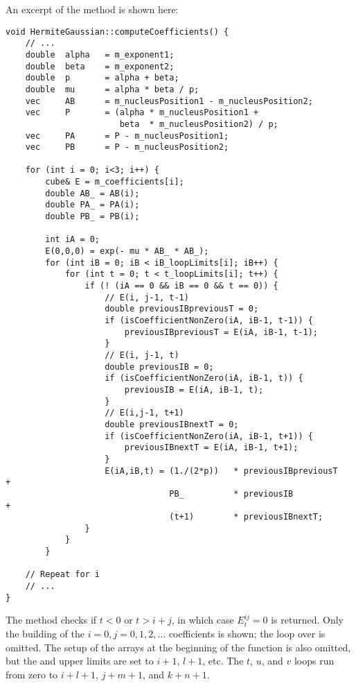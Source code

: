 \documentclass[../../master.tex]{subfiles}
\begin{document}
An excerpt of the  method is shown here:
\begin{lstlisting}[language={[std]c++}]
void HermiteGaussian::computeCoefficients() {
    // ...
    double  alpha   = m_exponent1;
    double  beta    = m_exponent2;
    double  p       = alpha + beta;
    double  mu      = alpha * beta / p;
    vec     AB      = m_nucleusPosition1 - m_nucleusPosition2;
    vec     P       = (alpha * m_nucleusPosition1 + 
                       beta  * m_nucleusPosition2) / p;
    vec     PA      = P - m_nucleusPosition1;
    vec     PB      = P - m_nucleusPosition2;

    for (int i = 0; i<3; i++) {
        cube& E = m_coefficients[i];
        double AB_ = AB(i);
        double PA_ = PA(i);
        double PB_ = PB(i);

        int iA = 0;
        E(0,0,0) = exp(- mu * AB_ * AB_);
        for (int iB = 0; iB < iB_loopLimits[i]; iB++) {
            for (int t = 0; t < t_loopLimits[i]; t++) {
                if (! (iA == 0 && iB == 0 && t == 0)) {
                    // E(i, j-1, t-1)
                    double previousIBpreviousT = 0;
                    if (isCoefficientNonZero(iA, iB-1, t-1)) {
                        previousIBpreviousT = E(iA, iB-1, t-1);
                    }
                    // E(i, j-1, t)
                    double previousIB = 0;
                    if (isCoefficientNonZero(iA, iB-1, t)) {
                        previousIB = E(iA, iB-1, t);
                    }
                    // E(i,j-1, t+1)
                    double previousIBnextT = 0;
                    if (isCoefficientNonZero(iA, iB-1, t+1)) {
                        previousIBnextT = E(iA, iB-1, t+1);
                    }
                    E(iA,iB,t) = (1./(2*p))   * previousIBpreviousT   +
                                 PB_          * previousIB            +
                                 (t+1)        * previousIBnextT;
                }
            }
        }

    // Repeat for i
    // ...
}
\end{lstlisting}
The  method checks if $t<0$ or $t>i+j$, in which case $E_t^{ij}=0$ is returned. Only the building of the $i=0,j=0,1,2,\dots$ coefficients is shown; the loop over  is omitted. The setup of the  arrays at the beginning of the function is also omitted, but the  and  upper limits are set to $i+1$, $l+1$, etc. The $t$, $u$, and $v$ loops run from zero to $i+l+1$, $j+m+1$, and $k+n+1$.
\end{document}
